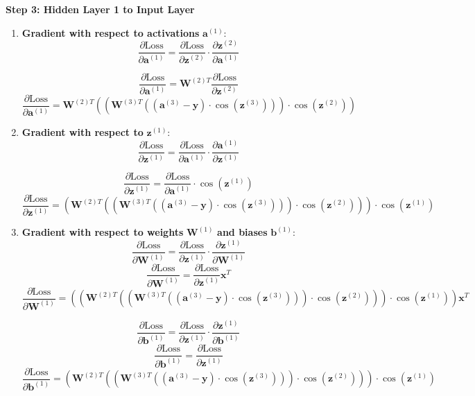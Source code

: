 \documentclass{ioereport}
\begin{document}
\textbf{Step 3: Hidden Layer 1 to Input Layer}
\begin{enumerate}[label=\textbf{\roman*.}]
  \item \textbf{Gradient with respect to activations} $\mathbf{a}^{(1)}$:
      \[
  \frac{\partial \text{Loss}}{\partial \mathbf{a}^{(1)}} = \frac{\partial \text{Loss}}{\partial \mathbf{z}^{(2)}} \cdot \frac{\partial \mathbf{z}^{(2)}}{\partial \mathbf{a}^{(1)}}
  \]
  
  \[
  \frac{\partial \text{Loss}}{\partial \mathbf{a}^{(1)}} = \mathbf{W}^{(2)T} \frac{\partial \text{Loss}}{\partial \mathbf{z}^{(2)}}
  \]
      \[
  \frac{\partial \text{Loss}}{\partial \mathbf{a}^{(1)}} = \mathbf{W}^{(2)T} \left(\left(\mathbf{W}^{(3)T} \left((\mathbf{a}^{(3)} - \mathbf{y}) \cdot \cos(\mathbf{z}^{(3)})\right)\right) \cdot \cos(\mathbf{z}^{(2)})\right)
  \]

  \item \textbf{Gradient with respect to} $\mathbf{z}^{(1)}$:
    \[
  \frac{\partial \text{Loss}}{\partial \mathbf{z}^{(1)}} = \frac{\partial \text{Loss}}{\partial \mathbf{a}^{(1)}} \cdot \frac{\partial \mathbf{a}^{(1)}}{\partial \mathbf{z}^{(1)}}
  \]

  \[
  \frac{\partial \text{Loss}}{\partial \mathbf{z}^{(1)}} = \frac{\partial \text{Loss}}{\partial \mathbf{a}^{(1)}} \cdot \cos(\mathbf{z}^{(1)})
  \]
    \[
  \frac{\partial \text{Loss}}{\partial \mathbf{z}^{(1)}} = \left(\mathbf{W}^{(2)T} \left(\left(\mathbf{W}^{(3)T} \left((\mathbf{a}^{(3)} - \mathbf{y}) \cdot \cos(\mathbf{z}^{(3)})\right)\right) \cdot \cos(\mathbf{z}^{(2)})\right)\right) \cdot \cos(\mathbf{z}^{(1)})
  \]

  \item \textbf{Gradient with respect to weights} $\mathbf{W}^{(1)}$ \textbf{and biases} $\mathbf{b}^{(1)}$:
       \[
  \frac{\partial \text{Loss}}{\partial \mathbf{W}^{(1)}} = \frac{\partial \text{Loss}}{\partial \mathbf{z}^{(1)}} \cdot \frac{\partial \mathbf{z}^{(1)}}{\partial \mathbf{W}^{(1)}}
  \]
  \[
  \frac{\partial \text{Loss}}{\partial \mathbf{W}^{(1)}} = \frac{\partial \text{Loss}}{\partial \mathbf{z}^{(1)}} \mathbf{x}^T
  \]
    \[
  \frac{\partial \text{Loss}}{\partial \mathbf{W}^{(1)}} = \left(\left(\mathbf{W}^{(2)T} \left(\left(\mathbf{W}^{(3)T} \left((\mathbf{a}^{(3)} - \mathbf{y}) \cdot \cos(\mathbf{z}^{(3)})\right)\right) \cdot \cos(\mathbf{z}^{(2)})\right)\right) \cdot \cos(\mathbf{z}^{(1)})\right) \mathbf{x}^T
  \]

  
         \[
  \frac{\partial \text{Loss}}{\partial \mathbf{b}^{(1)}} = \frac{\partial \text{Loss}}{\partial \mathbf{z}^{(1)}} \cdot \frac{\partial \mathbf{z}^{(1)}}{\partial \mathbf{b}^{(1)}}
  \]
  \[
  \frac{\partial \text{Loss}}{\partial \mathbf{b}^{(1)}} = \frac{\partial \text{Loss}}{\partial \mathbf{z}^{(1)}}
  \]
\[
  \frac{\partial \text{Loss}}{\partial \mathbf{b}^{(1)}} = \left(\mathbf{W}^{(2)T} \left(\left(\mathbf{W}^{(3)T} \left((\mathbf{a}^{(3)} - \mathbf{y}) \cdot \cos(\mathbf{z}^{(3)})\right)\right) \cdot \cos(\mathbf{z}^{(2)})\right)\right) \cdot \cos(\mathbf{z}^{(1)})
  \]
\end{enumerate}
\end{document}

